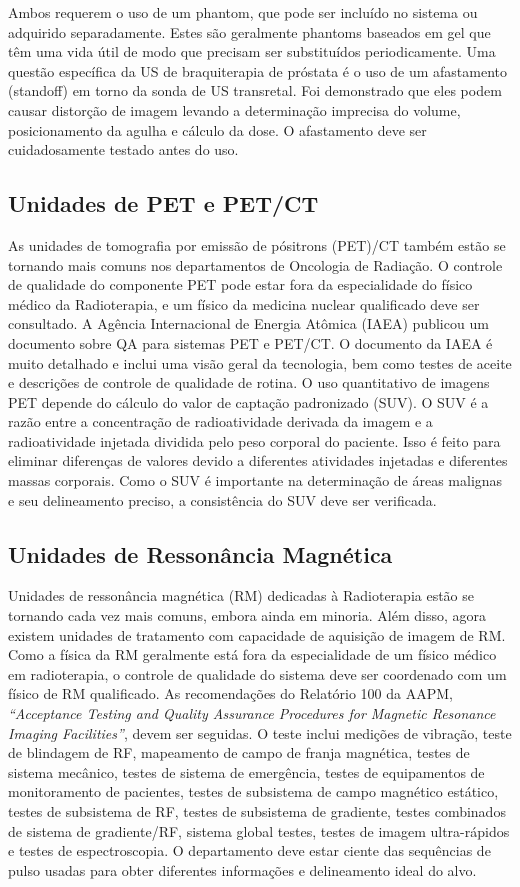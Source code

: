 \documentclass[11pt,a4paper]{article}
\begin{document}
	Ambos requerem o uso de um phantom, que pode ser incluído no sistema ou adquirido separadamente. Estes são geralmente phantoms baseados em gel que têm uma vida útil de modo que precisam ser substituídos periodicamente. Uma questão específica da US de braquiterapia de próstata é o uso de um afastamento (standoff) em torno da sonda de US transretal. Foi demonstrado que eles podem causar distorção de imagem levando a determinação imprecisa do volume, posicionamento da agulha e cálculo da dose. O afastamento deve ser cuidadosamente testado antes do uso.

\subsection*{Unidades de PET e PET/CT}

	As unidades de tomografia por emissão de pósitrons (PET)/CT também estão se tornando mais comuns nos departamentos de Oncologia de Radiação. O controle de qualidade do componente PET pode estar fora da especialidade do físico médico da Radioterapia, e um físico da medicina nuclear qualificado deve ser consultado. A Agência Internacional de Energia Atômica (IAEA) publicou um documento sobre QA para sistemas PET e PET/CT. O documento da IAEA é muito detalhado e inclui uma visão geral da tecnologia, bem como testes de aceite e descrições de controle de qualidade de rotina. O uso quantitativo de imagens PET depende do cálculo do valor de captação padronizado (SUV). O SUV é a razão entre a concentração de radioatividade derivada da imagem e a radioatividade injetada dividida pelo peso corporal do paciente. Isso é feito para eliminar diferenças de valores devido a diferentes atividades injetadas e diferentes massas corporais. Como o SUV é importante na determinação de áreas malignas e seu delineamento preciso, a consistência do SUV deve ser verificada.

\subsection*{Unidades de Ressonância Magnética}

	Unidades de ressonância magnética (RM) dedicadas à Radioterapia estão se tornando cada vez mais comuns, embora ainda em minoria. Além disso, agora existem unidades de tratamento com capacidade de aquisição de imagem de RM. Como a física da RM geralmente está fora da especialidade de um físico médico em radioterapia, o controle de qualidade do sistema deve ser coordenado com um físico de RM qualificado. As recomendações do Relatório 100 da AAPM,  \textit{``Acceptance Testing and Quality Assurance Procedures for Magnetic Resonance Imaging Facilities''}, devem ser seguidas. O teste inclui medições de vibração, teste de blindagem de RF, mapeamento de campo de franja magnética, testes de sistema mecânico, testes de sistema de emergência, testes de equipamentos de monitoramento de pacientes, testes de subsistema de campo magnético estático, testes de subsistema de RF, testes de subsistema de gradiente, testes combinados de sistema de gradiente/RF, sistema global testes, testes de imagem ultra-rápidos e testes de espectroscopia. O departamento deve estar ciente das sequências de pulso usadas para obter diferentes informações e delineamento ideal do alvo.
\end{document}
